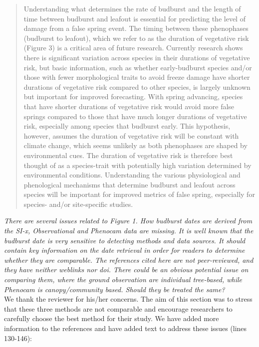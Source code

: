 \documentclass[11pt,a4paper]{article}
\begin{document}
\begin{quotation}
Understanding what determines the rate of budburst and the length of time between budburst and leafout is essential for predicting the level of damage from a false spring event. The timing between these phenophases (budburst to leafout), which we refer to as the duration of vegetative risk (Figure 3) is a critical area of future research. Currently research shows there is significant variation across species in their durations of vegetative risk, but basic information, such as whether early-budburst species and/or those with fewer morphological traits to avoid freeze damage have shorter durations of vegetative risk compared to other species, is largely unknown but important for improved forecasting. With spring advancing, species that have shorter durations of vegetative risk would avoid more false springs compared to those that have much longer durations of vegetative risk, especially among species that budburst early. This hypothesis, however, assumes the duration of vegetative risk will be constant with climate change, which seems unlikely as both phenophases are shaped by environmental cues. The duration of vegetative risk is therefore best thought of as a species-trait with potentially high variation determined by environmental conditions. Understanding the various physiological and phenological mechanisms that determine budburst and leafout across species will be important for improved metrics of false spring, especially for species- and/or site-specific studies. 
\end{quotation}

\textit{There are several issues related to Figure 1. How budburst dates are derived from the SI-x, Observational and Phenocam data are missing. It is well known that the budburst date is very sensitive to detecting methods and data sources. It should contain key information on the date retrieval in order for readers to determine whether they are comparable. The references cited here are not peer-reviewed, and they have neither weblinks nor doi. There could be an obvious potential issue on comparing them, where the ground observation are individual tree-based, while Phenocam is canopy/community based. Should they be treated the same?} \\

We thank the reviewer for his/her concerns. The aim of this section was to stress that these three methods are not comparable and encourage researchers to carefully choose the best method for their study. We have added more information to the references and have added text to address these issues (lines 130-146):
\end{document}
